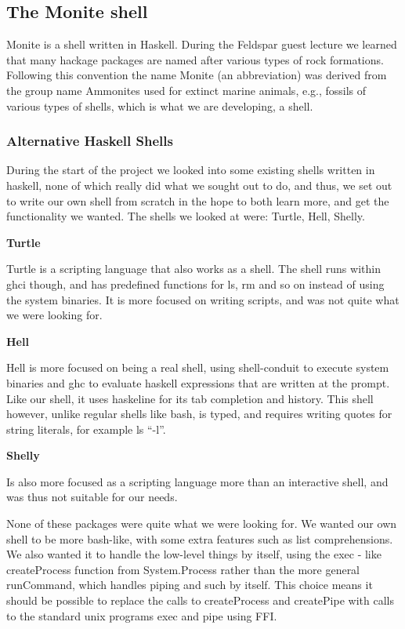 \documentclass[11pt,a4paper]{article}
\begin{document}
\subsection{The Monite shell}
\label{monite}

Monite is a shell written in Haskell. During the Feldspar guest lecture we
learned that many hackage packages are named after various types of rock
formations. Following this convention the name Monite (an abbreviation) was
derived from the group name Ammonites used for extinct marine animals, e.g.,
fossils of various types of shells, which is what we are developing, a shell.

\subsubsection{Alternative Haskell Shells}

During the start of the project we looked into some existing shells written in
haskell, none of which really did what we sought out to do, and thus, we set out
to write our own shell from scratch in the hope to both learn more, and get the
functionality we wanted. The shells we looked at were: Turtle, Hell, Shelly.

\textbf{Turtle}

Turtle is a scripting language that also works as a shell. The shell runs
within ghci though, and has predefined functions for ls, rm and so on instead
of using the system binaries. It is more focused on writing scripts, and was
not quite what we were looking for.

\textbf{Hell}

Hell is more focused on being a real shell, using shell-conduit to execute
system binaries and ghc to evaluate haskell expressions that are written at the
prompt. Like our shell, it uses haskeline for its tab completion and history.
This shell however, unlike regular shells like bash, is typed, and requires
writing quotes for string literals, for example ls ``-l''.

\textbf{Shelly}

Is also more focused as a scripting language more than an interactive shell,
and was thus not suitable for our needs.

None of these packages were quite what we were looking for. We wanted
our own shell to be more bash-like, with some extra features such as list
comprehensions. We also wanted it to handle the low-level things by itself,
using the exec - like createProcess function from System.Process rather than
the more general runCommand, which handles piping and such by itself. This
choice means it should be possible to replace the calls to createProcess and
createPipe with calls to the standard unix programs exec and pipe using FFI.
\end{document}
